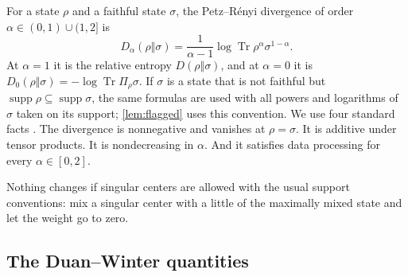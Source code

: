 \documentclass[11pt]{article}
\theoremstyle{definition}
\newtheorem{definition}[theorem]{Definition}
\DeclareMathOperator{\Tr}{Tr}
\DeclareMathOperator{\supp}{supp}
\newcommand{\vt}{\vartheta}
\begin{document}
For a state $\rho$ and a faithful state $\sigma$, the Petz--R\'enyi
divergence of order $\alpha\in(0,1)\cup(1,2]$ is
\[
 D_\alpha(\rho\Vert\sigma)=\frac{1}{\alpha-1}\log\Tr\rho^\alpha\sigma^{1-\alpha}.
\]
At $\alpha=1$ it is the relative entropy $D(\rho\Vert\sigma)$, and at
$\alpha=0$ it is $D_0(\rho\Vert\sigma)=-\log\Tr\Pi_\rho\sigma$.  If $\sigma$
is a state that is not faithful but $\supp\rho\subseteq\supp\sigma$, the same
formulas are used with all powers and logarithms of $\sigma$ taken on its
support; \cref{lem:flagged} uses this convention.  We use four
standard facts \cite{Petz1986,Tomamichel2016}.  The divergence is
nonnegative and vanishes at $\rho=\sigma$.  It is additive under tensor
products.  It is nondecreasing in $\alpha$.  And it satisfies data processing
for every $\alpha\in[0,2]$.


Nothing changes if singular centers are allowed with the usual support
conventions: mix a singular center with a little of the maximally mixed state
and let the weight go to zero.

\subsection{The Duan--Winter quantities}\label{sec:dw-quantities}
\end{document}
